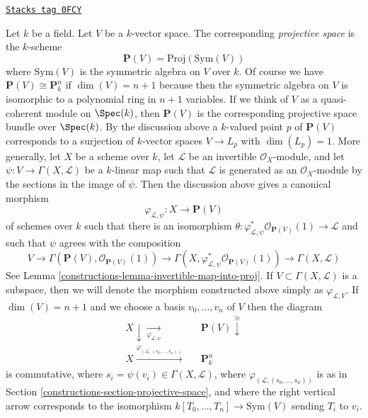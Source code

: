 \begin{example}

\label{constructions-example-projective-space}
\href{https://stacks.math.columbia.edu/tag/0FCY}{\texttt{Stacks tag 0FCY}}

Let $k$ be a field. Let $V$ be a $k$-vector space. The corresponding
{\it projective space} is the $k$-scheme
$$
\mathbf{P}(V) = \text{Proj}(\text{Sym}(V))
$$
where $\text{Sym}(V)$ is the symmetric algebra on $V$ over $k$.
Of course we have $\mathbf{P}(V) \cong \mathbf{P}^n_k$ if $\dim(V) = n + 1$
because then the symmetric algebra on $V$ is isomorphic to a polynomial
ring in $n + 1$ variables. If we
think of $V$ as a quasi-coherent module on $\Spec(k)$, then $\mathbf{P}(V)$
is the corresponding projective space bundle over $\Spec(k)$. By the
discussion above a $k$-valued point $p$ of $\mathbf{P}(V)$ corresponds to
a surjection of $k$-vector spaces $V \to L_p$ with $\dim(L_p) = 1$.
More generally, let $X$ be a scheme over $k$, let $\mathcal{L}$ be an
invertible $\mathcal{O}_X$-module, and let
$\psi : V \to \Gamma(X, \mathcal{L})$ be a $k$-linear map
such that $\mathcal{L}$ is generated as an $\mathcal{O}_X$-module
by the sections in the image of $\psi$. Then the discussion above
gives a canonical morphism
$$
\varphi_{\mathcal{L}, \psi} : X \longrightarrow \mathbf{P}(V)
$$
of schemes over $k$ such that there is an isomorphism
$\theta : \varphi_{\mathcal{L}, \psi}^*\mathcal{O}_{\mathbf{P}(V)}(1)
\to \mathcal{L}$ and such that $\psi$ agrees with the composition
$$
V \to
\Gamma(\mathbf{P}(V), \mathcal{O}_{\mathbf{P}(V)}(1))
\to
\Gamma(X, \varphi_{\mathcal{L}, \psi}^*\mathcal{O}_{\mathbf{P}(V)}(1))
\to
\Gamma(X, \mathcal{L})
$$
See Lemma \ref{constructions-lemma-invertible-map-into-proj}. If
$V \subset \Gamma(X, \mathcal{L})$ is a subspace, then we will
denote the morphism constructed above simply as
$\varphi_{\mathcal{L}, V}$.
If $\dim(V) = n + 1$ and we choose a basis $v_0, \ldots, v_n$ of $V$
then the diagram
$$
\begin{array}{ccc}X \downarrow\underset{\varphi_{\mathcal{L}, \psi}}{\longrightarrow} &  & \mathbf{P}(V) \overset{\cong}{\downarrow} \\ X \overset{\varphi_{(\mathcal{L}, (s_0, \ldots, s_n))}}{\longrightarrow} &  & \mathbf{P}^n_k\end{array}
$$
is commutative, where $s_i = \psi(v_i) \in \Gamma(X, \mathcal{L})$, where
$\varphi_{(\mathcal{L}, (s_0, \ldots, s_n))}$
is as in Section \ref{constructions-section-projective-space},
and where the right vertical arrow corresponds
to the isomorphism $k[T_0, \ldots, T_n] \to \text{Sym}(V)$ sending
$T_i$ to $v_i$.
\end{example}

